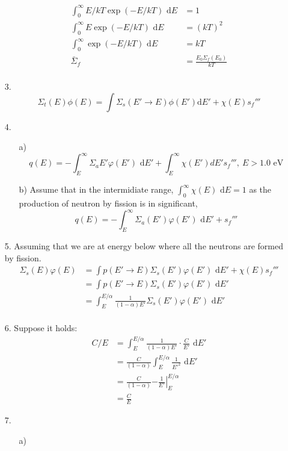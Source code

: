 \documentclass{article}
\begin{document}
\begin{itemize}
\begin{align*}
        \int_{0}^{\infty}E/kT \exp(-E/kT) \text{ d}E&=1\\
        \int_{0}^{\infty}E \exp(-E/kT) \text{ d}E&=(kT)^2\\
        \int_{0}^{\infty}\exp(-E/kT)\text{ d}E&=kT\\
        \bar{\Sigma}_f&=\frac{E_0\Sigma_f(E_0)}{kT}\\
    \end{align*}
    \item [3.]
    \[\Sigma_t(E)\phi(E)=\int \Sigma_s(E'\rightarrow E)\phi(E')\text{d}E' + \chi(E)s_f'''\]
    \item [4.]
    \begin{itemize}
        \item [a)]
        \[q(E)=-\int_{E}^{\infty}\Sigma_a{E'}\varphi(E')\text{ d}E'+\int_{E}^{\infty}\chi(E')dE's_f''',\ E>1.0\text{ eV}\]
        \item [b)]
        Assume that in the intermidiate range, \(\int_{0}^{\infty}\chi(E)\text{ d}E=1\) as the production of neutron by fission is in significant,
        \[q(E)=-\int^\infty_E \Sigma_a(E')\varphi(E')\text{ d}E'+ s_f'''\]
    \end{itemize}
    \newpage
    \item [5.]Assuming that we are at energy below where all the neutrons are formed by fission.
    \begin{align*}
        \Sigma_s(E)\varphi(E)&=\int p(E'\rightarrow E)\Sigma_s(E')\varphi(E')\text{ d}E'+\chi(E)s_f'''\\
        &=\int p(E'\rightarrow E)\Sigma_s(E')\varphi(E')\text{ d}E'\\
        &=\int _E^{E/\alpha}\frac{1}{(1-\alpha)E'}\Sigma_s(E')\varphi(E')\text{ d}E'\\
    \end{align*}
    \item [6.]Suppose it holds:
    \begin{align*}
        C/E &=\int_{E}^{E/\alpha}\frac{1}{(1-\alpha)E'}\cdot \frac{C}{E'}\text{ d}E'\\
        &=\frac{C}{(1-\alpha)}\int_{E}^{E/\alpha}\frac{1}{E'^2} \text{ d}E'\\
        &=\frac{C}{(1-\alpha)}\left.-\frac{1}{E'}\right|^{E/\alpha}_{E}\\
        &=\frac{C}{E}
    \end{align*}
    \item [7.]
    \begin{itemize}
        \item [a)]

\end{itemize}
\end{itemize}
\end{document}
